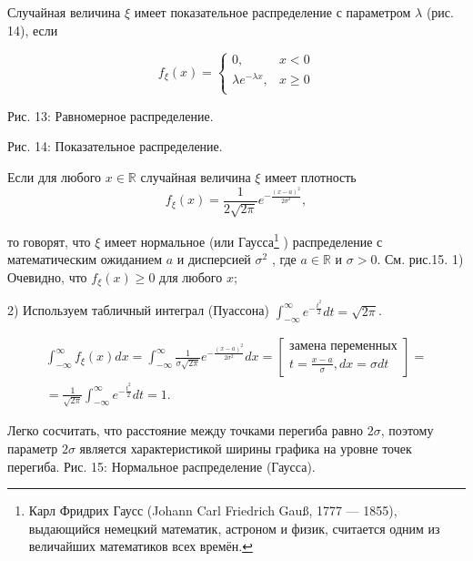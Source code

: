 \begin{definition}
Случайная величина $\xi$ имеет показательное распределение с параметром $\lambda$ (рис. 14), если

\begin{equation}
	f_{\xi}(x) = 
	\left\{
	\begin{aligned}
		0, & x<0\\
		\lambda e^{-\lambda x}, & x \geq 0\\
	\end{aligned}
\end{equation}

Рис. 13: Равномерное распределение.

Рис. 14: Показательное распределение.

\begin{definition}
Если для любого $x \in \mathbb{R}$ случайная величина $\xi$ имеет плотность
\begin{equation}
	f_{\xi}(x) = \frac{1}{2 \sqrt{2\pi}}e^{-\frac{(x-a)^2}{2\sigma^2}},
\end{equation}

то говорят, что $\xi$ имеет нормальное (или Гаусса\footnote{
Карл Фридрих Гаусс (Johann Carl Friedrich Gauß, 1777 — 1855), выдающийся немецкий математик,
астроном и физик, считается одним из величайших математиков всех времён.	
} 
) распределение с математическим ожиданием $a$ и дисперсией $\sigma^2$ , где $a \in \mathbb{R}$ и $\sigma > 0$. См. рис.15.
1) Очевидно, что $f_{\xi}(x) \geq 0$ для любого $x$;

2) Используем табличный интеграл (Пуассона)
$\int_{-\infty}^{\infty}e^{-\frac{t^2}{2}}dt=\sqrt{2\pi}$.

\begin{gather*}
	\int_{-\infty}^{\infty} f_{\xi}(x)dx = \int_{-\infty}^{\infty} \frac{1}{\sigma \sqrt{2\pi}}e^{-\frac{(x-a)^2}{2\sigma^2}}dx =
	\left[
	\begin{aligned}
		\text{замена переменных}\\
		t = \frac{x-a}{\sigma}, dx = \sigma dt
	\end{aligned}\right]=\\=
	\frac{1}{\sqrt{2\pi}}\int_{-\infty}^{\infty}e^{-\frac{t^2}{2}}dt=1.
\end{gather*}
\end{definition}

\begin{prop}
 Легко сосчитать, что расстояние между точками перегиба равно $2\sigma$, поэтому параметр $2\sigma$ является характеристикой ширины графика на уровне точек перегиба.
 Рис. 15: Нормальное распределение (Гаусса). 


\end{prop}
\end{definition}
